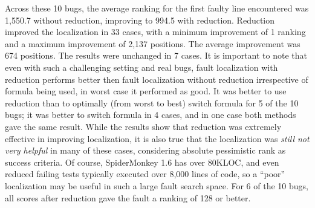 Across these 10 bugs, the average ranking for the first faulty line
encountered was 1,550.7 without reduction, improving to 994.5 with
reduction.  Reduction improved the localization in 33 cases, with a
minimum improvement of 1 ranking and a maximum improvement of 2,137
positions.  The average improvement was 674 positions.  The results
were unchanged in 7 cases. It is important to note that even with such a challenging setting and real bugs, fault localization with reduction performs better then fault localization without reduction irrespective of formula being used, in worst case it performed as good. It was better to use reduction than to optimally (from worst to
best) switch formula for 5 of the 10 bugs; it was better to switch
formula in 4 cases, and in one case both methods gave the same result.
While the results show that reduction was extremely effective in
improving localization, it is also true that the localization was
\emph{still not very helpful} in many of these cases, considering absolute pessimistic rank as success criteria.  Of course,
SpiderMonkey 1.6 has over 80KLOC, and even reduced failing tests
typically executed over 8,000 lines of code, so a ``poor''
localization may be useful in such a large fault search space.  For 6
of the 10 bugs, all scores after reduction gave the fault a ranking of
128 or better.  

